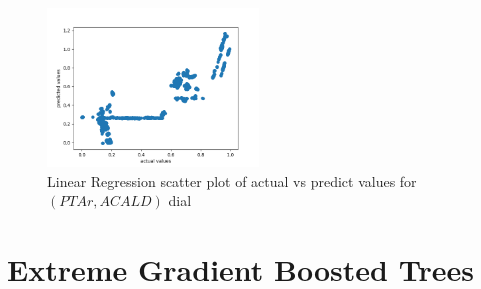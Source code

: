 \documentclass[12pt,chapterheads]{ucsd}
\begin{document}
\begin{figure}[h] 
\centering
\includegraphics[width=0.5\textwidth]{Figures/PTAr_ACALD_lr}
\caption[Linear Regression scatter plot of actual vs predict values for $(PTAr, ACALD)$ dial]
{Linear Regression scatter plot of actual vs predict values for $(PTAr, ACALD)$ dial}
\label{fig:PtarAcaldLr}
\end{figure}


\section{Extreme Gradient Boosted Trees} \label{sec:xgboostRes}
\end{document}
